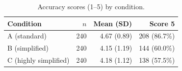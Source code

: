 \begin{table}[H]
\caption{Accuracy scores (1--5) by condition.}
\label{tab:accuracy:cond}
\centering
\begin{tabular}{lrrr}
\toprule
Condition & $n$ & Mean (SD) & Score 5 \\
\midrule
A (standard) & 240 & 4.67 (0.89) & 208 (86.7\%) \\
B (simplified) & 240 & 4.15 (1.19) & 144 (60.0\%) \\
C (highly simplified) & 240 & 4.18 (1.12) & 138 (57.5\%) \\
\bottomrule
\end{tabular}
\end{table}
